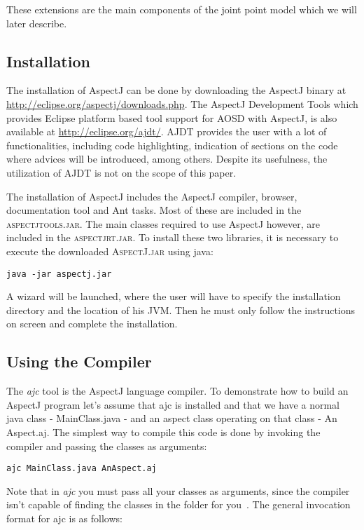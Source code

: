 \documentclass{template}
\begin{document}
These extensions are the main components of the joint point model which we will later describe.

\subsection{Installation}

The installation of AspectJ can be done by downloading the AspectJ binary at \url{http://eclipse.org/aspectj/downloads.php}. 
The AspectJ Development Tools which provides Eclipse platform based tool support for AOSD with AspectJ, is also available at \url{http://eclipse.org/ajdt/}. AJDT provides the user with a lot of functionalities, including code highlighting, indication of sections on the code where advices will be introduced, among others. Despite its usefulness, the utilization of AJDT is not on the scope of this paper.

The installation of AspectJ includes the AspectJ compiler, browser, documentation tool and Ant tasks. Most of these are included in the \textsc{aspectjtools.jar}. The main classes required to use AspectJ however, are included in the \textsc{aspectjrt.jar}. To install these two libraries, it is necessary to execute the downloaded \textsc{AspectJ.jar} using java:

\verb!java -jar aspectj.jar!

A wizard will be launched, where the user will have to specify the installation directory and the location of his JVM. Then he must only follow the instructions on screen and complete the installation.

\subsection{Using the Compiler}

The \textit{ajc} tool is the AspectJ language compiler. To demonstrate how to build an AspectJ program let's assume that ajc is installed and that we have a normal java class - MainClass.java - and an aspect class operating on that class - An Aspect.aj. The simplest way to compile this code is done by invoking the compiler and passing the classes as arguments:

\verb!ajc MainClass.java AnAspect.aj!

Note that in \textit{ajc} you must pass all your classes as arguments, since the compiler isn't capable of finding the classes in the folder for you~\cite{ajcsite}. The general invocation format for ajc is as follows: 
\end{document}
